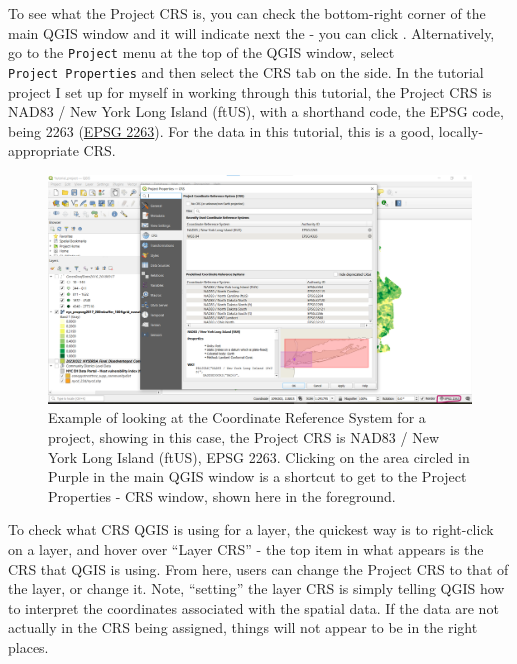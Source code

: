 \documentclass[
  letterpaper,
  DIV=11,
  numbers=noendperiod]{scrreprt}
\begin{document}
To see what the Project CRS is, you can check the bottom-right corner of
the main QGIS window and it will indicate next the
 - you can
click . Alternatively, go to the \texttt{Project} menu at the top of the
QGIS window, select \texttt{Project\ Properties} and then select the CRS
tab on the side. In the tutorial project I set up for myself in working
through this tutorial, the Project CRS is NAD83 / New York Long Island
(ftUS), with a shorthand code, the EPSG code, being 2263
(\href{https://epsg.io/2263}{EPSG 2263}). For the data in this tutorial,
this is a good, locally-appropriate CRS.

\begin{figure}

{\centering \includegraphics{./images/project_crs.png}

}

\caption{Example of looking at the Coordinate Reference System for a
project, showing in this case, the Project CRS is NAD83 / New York Long
Island (ftUS), EPSG 2263. Clicking on the area circled in Purple in the
main QGIS window is a shortcut to get to the Project Properties - CRS
window, shown here in the foreground.}

\end{figure}

To check what CRS QGIS is using for a layer, the quickest way is to
right-click on a layer, and hover over ``Layer CRS'' - the top item in
what appears is the CRS that QGIS is using. From here, users can change
the Project CRS to that of the layer, or change it. Note, ``setting''
the layer CRS is simply telling QGIS how to interpret the coordinates
associated with the spatial data. If the data are not actually in the
CRS being assigned, things will not appear to be in the right places.
\end{document}
